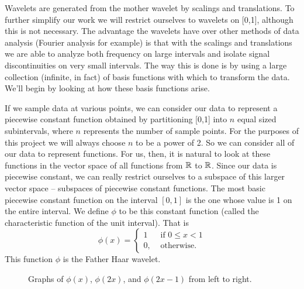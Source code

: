 Wavelets are generated from the mother wavelet by scalings and translations. To further simplify our work we will restrict ourselves to wavelets on [0,1], although this is not necessary. The advantage the wavelets have over other methods of data analysis (Fourier analysis for example) is that with the scalings and translations we are able to analyze both frequency on large intervals and isolate signal discontinuities on very small intervals. The way this is done is by using a large collection (infinite, in fact) of basis functions with which to transform the data. We'll begin by looking at how these basis functions arise. 

If we sample data at various points, we can consider our data to represent a piecewise constant function obtained by partitioning [0,1] into $n$ equal sized subintervals, where $n$ represents the number of sample points. For the purposes of this project we will always choose $n$ to be a power of 2. So we can consider all of our data to represent functions. For us, then, it is natural to look at these functions in the vector space of all functions from $\mathbb{R}$ to $\mathbb{R}$. Since our data is piecewise constant, we can really restrict ourselves to a subspace of this larger vector space -- subspaces of piecewise constant functions.  The most basic piecewise constant function on the interval $[0,1]$ is the one whose value is 1 on the entire interval. We define $\phi$ to be this constant function (called the characteristic function of the unit interval). That is  
\[\phi(x) = \begin{cases}
1 &\text{ if } 0 \leq x < 1 \\
0, 	& \text{ otherwise.} 
\end{cases}\]
This function $\phi$ is the Father Haar wavelet. 
\begin{figure}[h]
\begin{center}
\end{center}
\caption{Graphs of $\phi(x)$, $\phi(2x)$, and $\phi(2x-1)$ from left to right.}
\label{F:phi_graphs_1}
\end{figure}


